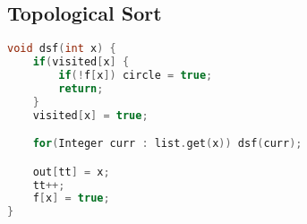 \subsection{Topological Sort}
\begin{lstlisting}[language=C++]
void dsf(int x) {
	if(visited[x] {
		if(!f[x]) circle = true;
		return;
	}
	visited[x] = true;	

	for(Integer curr : list.get(x)) dsf(curr);

	out[tt] = x;
	tt++;
	f[x] = true;
}
\end{lstlisting}
